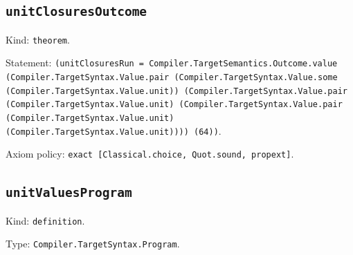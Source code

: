 \documentclass[11pt]{article}
\begin{document}
\subsection*{\texttt{unitClosuresOutcome}}
\noindent Kind: \texttt{theorem}.\par
\noindent Statement: \texttt{(unitClosuresRun = Compiler.TargetSemantics.Outcome.value (Compiler.TargetSyntax.Value.pair (Compiler.TargetSyntax.Value.some (Compiler.TargetSyntax.Value.unit)) (Compiler.TargetSyntax.Value.pair (Compiler.TargetSyntax.Value.unit) (Compiler.TargetSyntax.Value.pair (Compiler.TargetSyntax.Value.unit) (Compiler.TargetSyntax.Value.unit)))) (64))}.\par
\noindent Axiom policy: \texttt{exact [Classical.choice, Quot.sound, propext]}.\par
\subsection*{\texttt{unitValuesProgram}}
\noindent Kind: \texttt{definition}.\par
\noindent Type: \texttt{Compiler.TargetSyntax.Program}.\par
\end{document}
